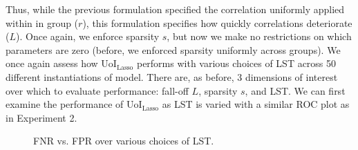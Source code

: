 \documentclass[11pt]{article}
\begin{document}
Thus, while the previous formulation specified the correlation uniformly applied within in group ($r$), this formulation specifies how quickly correlations deteriorate ($L$). Once again, we enforce sparsity $s$, but now we make no restrictions on which parameters are zero (before, we enforced sparsity uniformly across groups). We once again assess how UoI$_{\text{Lasso}}$ performs with various choices of LST across 50 different instantiations of model. There are, as before, 3 dimensions of interest over which to evaluate performance: fall-off $L$, sparsity $s$, and LST. We can first examine the performance of UoI$_{\text{Lasso}}$ as LST is varied with a similar ROC plot as in Experiment 2.
\begin{figure}[H]
	\centering
	\caption{FNR vs. FPR over various choices of LST.}
	\label{fig:exp3-roc}
\end{figure}
\end{document}
